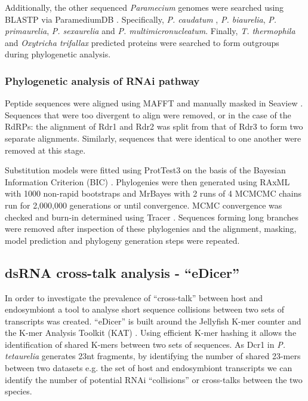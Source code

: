 Additionally, the other sequenced \textit{Paramecium} genomes 
were searched using BLASTP via ParamediumDB \citep{Arnaiz2007,Arnaiz2011a}.
Specifically, \textit{P. caudatum} \citep{McGrath2014}, 
\textit{P. biaurelia}, \textit{P. primaurelia}, \textit{P. sexaurelia}
and \textit{P. multimicronucleatum}. Finally,  \textit{T. thermophila} \citep{Eisen2006}
and \textit{Oxytricha trifallax} \citep{Swart2013}
predicted proteins were searched to form outgroups during phylogenetic
analysis.

\subsubsection{Phylogenetic analysis of RNAi pathway}

Peptide sequences were aligned using MAFFT \citep{Katoh2002} and manually
masked in Seaview \citep{Gouy2010}.
Sequences that were too divergent to align were removed, or in the case
of the RdRPs: the alignment of Rdr1 and Rdr2 was split from that of Rdr3 to form
two separate alignments.  Similarly, sequences that were identical
to one another were removed at this stage. 

Substitution models were fitted using ProtTest3 on the basis of the Bayesian
Information Criterion (BIC) \citep{Darriba2011c}.
Phylogenies were then generated using RAxML with 1000 non-rapid bootstraps and MrBayes 
with 2 runs of 4 MCMCMC chains run for 2,000,000 generations or until convergence.
MCMC convergence was checked and burn-in determined using Tracer \citep{rambaut2007tracer}.
Sequences forming long branches were removed after inspection of these phylogenies
and the alignment, masking, model prediction and phylogeny generation steps
were repeated.

\subsection{dsRNA cross-talk analysis - ``eDicer''}

In order to investigate the prevalence of ``cross-talk'' between 
host and endosymbiont a tool to analyse short sequence collisions between two sets
of transcripts was created.  ``eDicer'' is built around 
the Jellyfish K-mer counter \citep{Marcais2011} 
and the K-mer Analysis Toolkit (KAT) \citep{ClavijoKAT}.  Using efficient
K-mer hashing it allows the identification of shared K-mers between
two sets of sequences.  As Dcr1 in \textit{P. tetaurelia} generates
23nt fragments, by identifying the number of shared 23-mers between
two datasets e.g. the set of host and endosymbiont transcripts 
we can identify the number of potential RNAi ``collisions'' or cross-talks
between the two species. 


